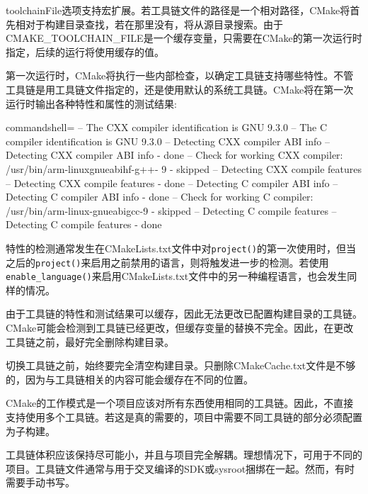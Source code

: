 toolchainFile选项支持宏扩展。若工具链文件的路径是一个相对路径，CMake将首先相对于构建目录查找，若在那里没有，将从源目录搜索。由于CMAKE\_TOOLCHAIN\_FILE是一个缓存变量，只需要在CMake的第一次运行时指定，后续的运行将使用缓存的值。

第一次运行时，CMake将执行一些内部检查，以确定工具链支持哪些特性。不管工具链是用工具链文件指定的，还是使用默认的系统工具链。CMake将在第一次运行时输出各种特性和属性的测试结果:

{\footnotesize
\begin{tcblisting}{commandshell={}}
-- The CXX compiler identification is GNU 9.3.0
-- The C compiler identification is GNU 9.3.0
-- Detecting CXX compiler ABI info
-- Detecting CXX compiler ABI info - done
-- Check for working CXX compiler: /usr/bin/arm-linuxgnueabihf-g++- 9 - skipped
-- Detecting CXX compile features
-- Detecting CXX compile features - done
-- Detecting C compiler ABI info
-- Detecting C compiler ABI info - done
-- Check for working C compiler: /usr/bin/arm-linux-gnueabigcc-9 - skipped
-- Detecting C compile features
-- Detecting C compile features - done
\end{tcblisting}
}

特性的检测通常发生在CMakeLists.txt文件中对\texttt{project()}的第一次使用时，但当之后的\texttt{project()}来启用之前禁用的语言，则将触发进一步的检测。若使用\texttt{enable\_language()}来启用CMakeLists.txt文件中的另一种编程语言，也会发生同样的情况。

由于工具链的特性和测试结果可以缓存，因此无法更改已配置构建目录的工具链。CMake可能会检测到工具链已经更改，但缓存变量的替换不完全。因此，在更改工具链之前，最好完全删除构建目录。

\begin{tcolorbox}[colback=blue!5!white,colframe=blue!75!black,title=配置完成后切换工具链]
切换工具链之前，始终要完全清空构建目录。只删除CMakeCache.txt文件是不够的，因为与工具链相关的内容可能会缓存在不同的位置。
\end{tcolorbox}

CMake的工作模式是一个项目应该对所有东西使用相同的工具链。因此，不直接支持使用多个工具链。若这是真的需要的，项目中需要不同工具链的部分必须配置为子构建。

工具链体积应该保持尽可能小，并且与项目完全解耦。理想情况下，可用于不同的项目。工具链文件通常与用于交叉编译的SDK或sysroot捆绑在一起。然而，有时需要手动书写。












